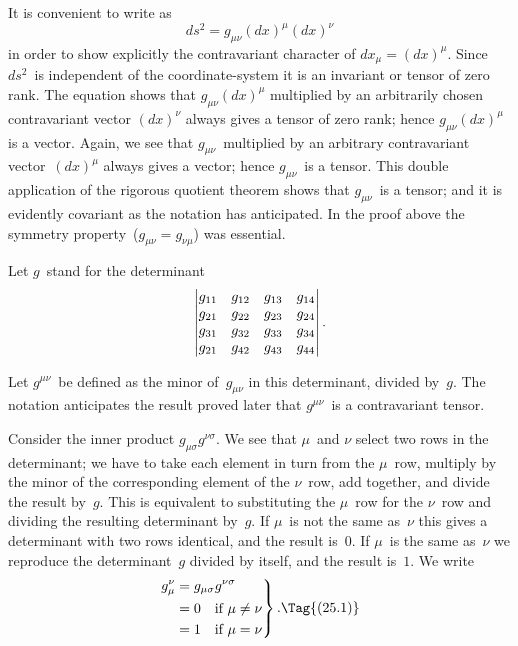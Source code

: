 \documentclass[12pt]{book}
\begin{document}
%

It is convenient to write  as
\[
ds^{2} = g_{\mu\nu} (dx)^{\mu} (dx)^{\nu}
\]
in order to show explicitly the contravariant character of $dx_{\mu} = (dx)^{\mu}$. Since
$ds^{2}$~is independent of the coordinate\hyp{}system it is an invariant or tensor
of zero rank. The equation shows that $g_{\mu\nu} (dx)^{\mu}$ multiplied by an arbitrarily
chosen contravariant vector $(dx)^{\nu}$ always gives a tensor of zero rank; hence
$g_{\mu\nu} (dx)^{\mu}$ is a vector. Again, we see that $g_{\mu\nu}$~multiplied by an arbitrary contravariant
vector~$(dx)^{\mu}$ always gives a vector; hence $g_{\mu\nu}$~is a tensor. This
double application of the rigorous quotient theorem shows that $g_{\mu\nu}$~is a
tensor; and it is evidently covariant as the notation has anticipated.
In the proof above the symmetry property~($g_{\mu\nu} = g_{\nu\mu}$) was essential.

Let $g$~stand for the determinant
\[
\left\lvert
\begin{array}{@{}cccc@{}}
  g_{11} & g_{12} & g_{13} & g_{14} \\
  g_{21} & g_{22} & g_{23} & g_{24} \\
  g_{31} & g_{32} & g_{33} & g_{34} \\
  g_{21} & g_{42} & g_{43} & g_{44} \\
\end{array}\right\rvert.
\]

Let $g^{\mu\nu}$~be defined as the minor of~$g_{\mu\nu}$ in this determinant, divided by~$g$\footnotemark.\footnotetext
  {The notation anticipates the result proved later that $g^{\mu\nu}$~is a contravariant tensor.}

Consider the inner product $g_{\mu\sigma} g^{\nu\sigma}$. We see that $\mu$~and $\nu$ select two rows
in the determinant; we have to take each element in turn from the $\mu$~row,
multiply by the minor of the corresponding element of the $\nu$~row, add
together, and divide the result by~$g$. This is equivalent to substituting the
$\mu$~row for the $\nu$~row and dividing the resulting determinant by~$g$. If $\mu$~is not
the same as~$\nu$ this gives a determinant with two rows identical, and the
result is~$0$. If $\mu$~is the same as~$\nu$ we reproduce the determinant~$g$ divided by
itself, and the result is~$1$. We write
\[
\left.
\begin{aligned}
  g_{\mu}^{\nu} &= g_{\mu\sigma} g^{\nu\sigma} \\
  &= 0 \quad\text{if $\mu \neq \nu$} \\
  &= 1 \quad\text{if $\mu = \nu$}
\end{aligned}
\right\}.
\Tag{(25.1)}
\]
\end{document}
